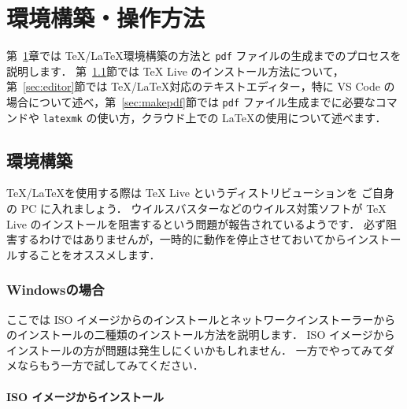 \chapter{環境構築・操作方法}
\label{ch:howtouse}

第~\ref{ch:howtouse}章では \TeX/\LaTeX 環境構築の方法と \verb|pdf| ファイルの生成までのプロセスを説明します．
第~\ref{sec:environment}節では TeX Live のインストール方法について，第~\ref{sec:editor}節では \TeX/\LaTeX 対応のテキストエディター，特に VS Code の場合について述べ，第~\ref{sec:makepdf}節では \verb|pdf| ファイル生成までに必要なコマンドや \verb|latexmk| の使い方，クラウド上での \LaTeX の使用について述べます．

\section{環境構築}
\label{sec:environment}

\TeX/\LaTeX を使用する際は TeX Live というディストリビューションを ご自身の PC に入れましょう．
ウイルスバスターなどのウイルス対策ソフトが TeX Live のインストールを阻害するという問題が報告されているようです．
必ず阻害するわけではありませんが，一時的に動作を停止させておいてからインストールすることをオススメします．


\subsection{Windowsの場合}
\label{ssec:windows}

ここでは ISO イメージからのインストールとネットワークインストーラーからのインストールの二種類のインストール方法を説明します．
ISO イメージからインストールの方が問題は発生しにくいかもしれません．
一方でやってみてダメならもう一方で試してみてください．

\subsubsection*{ISO イメージからインストール}

